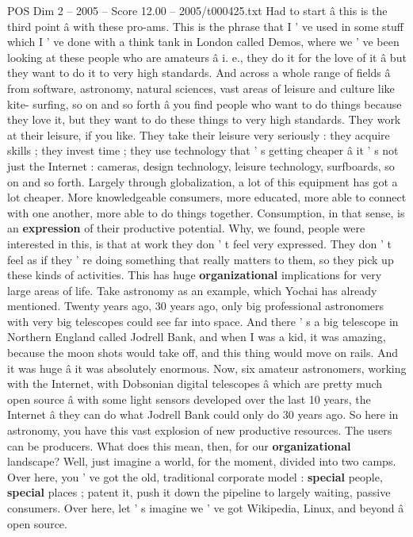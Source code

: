 \begin{textsample}{POS Dim 2 – 2005 – Score 12.00 – 2005/t000425.txt}
Had to start â this is the third point â with these pro-ams.
This is the phrase that I ' ve used in some stuff which I ' ve done with a think tank in London called Demos, where we ' ve been looking at these people who are amateurs â i. e., they do it for the love of it â but they want to do it to very high standards.
And across a whole range of fields â from software, astronomy, natural sciences, vast areas of leisure and culture like kite- surfing, so on and so forth â you find people who want to do things because they love it, but they want to do these things to very high standards.
They work at their leisure, if you like.
They take their leisure very seriously : they acquire skills ; they invest time ; they use technology that ' s getting cheaper â it ' s not just the Internet : cameras, design technology, leisure technology, surfboards, so on and so forth.
Largely through globalization, a lot of this equipment has got a lot cheaper.
More knowledgeable consumers, more educated, more able to connect with one another, more able to do things together.
Consumption, in that sense, is an \textbf{expression} of their productive potential.
Why, we found, people were interested in this, is that at work they don ' t feel very expressed.
They don ' t feel as if they ' re doing something that really matters to them, so they pick up these kinds of activities.
This has huge \textbf{organizational} implications for very large areas of life.
Take astronomy as an example, which Yochai has already mentioned.
Twenty years ago, 30 years ago, only big professional astronomers with very big telescopes could see far into space.
And there ' s a big telescope in Northern England called Jodrell Bank, and when I was a kid, it was amazing, because the moon shots would take off, and this thing would move on rails.
And it was huge â it was absolutely enormous.
Now, six amateur astronomers, working with the Internet, with Dobsonian digital telescopes â which are pretty much open source â with some light sensors developed over the last 10 years, the Internet â they can do what Jodrell Bank could only do 30 years ago.
So here in astronomy, you have this vast explosion of new productive resources.
The users can be producers.
What does this mean, then, for our \textbf{organizational} landscape?
Well, just imagine a world, for the moment, divided into two camps.
Over here, you ' ve got the old, traditional corporate model : \textbf{special} people, \textbf{special} places ; patent it, push it down the pipeline to largely waiting, passive consumers.
Over here, let ' s imagine we ' ve got Wikipedia, Linux, and beyond â open source.

\end{textsample}
